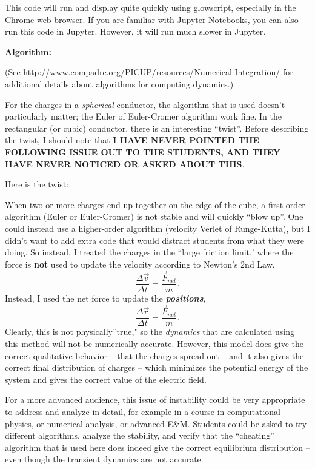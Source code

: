 \documentclass[]{article}
\begin{document}
This code will run and display quite quickly using glowscript,
especially in the Chrome web browser. If you are familiar with Jupyter
Notebooks, you can also run this code in Jupyter. However, it will run
much slower in Jupyter.

\textbf{Algorithm:}

(See
\url{http://www.compadre.org/PICUP/resources/Numerical-Integration/} for
additional details about algorithms for computing dynamics.)

For the charges in a \emph{spherical} conductor, the algorithm that is
used doesn't particularly matter; the Euler of Euler-Cromer algorithm
work fine. In the rectangular (or cubic) conductor, there is an
interesting ``twist''. Before describing the twist, I should note that
\textbf{I HAVE NEVER POINTED THE FOLLOWING ISSUE OUT TO THE STUDENTS,
AND THEY HAVE NEVER NOTICED OR ASKED ABOUT THIS}.

Here is the twist:

When two or more charges end up together on the edge of the cube, a
first order algorithm (Euler or Euler-Cromer) is not stable and will
quickly ``blow up''. One could instead use a higher-order algorithm
(velocity Verlet of Runge-Kutta), but I didn't want to add extra code
that would distract students from what they were doing. So instead, I
treated the charges in the ``large friction limit,' where the force is
\textbf{not} used to update the velocity according to Newton's 2nd Law,
\[\frac{\Delta \vec{v}}{\Delta t} = \frac{\vec{F}_{net}}{m}.\] Instead,
I used the net force to update the \textbf{\emph{positions}},
\[\frac{\Delta \vec{r}}{\Delta t} = \frac{\vec{F}_{net}}{m}.\] Clearly,
this is not physically''true," so the \emph{dynamics} that are
calculated using this method will not be numerically accurate. However,
this model does give the correct qualitative behavior -- that the
charges spread out -- and it also gives the correct final distribution
of charges -- which minimizes the potential energy of the system and
gives the correct value of the electric field.

For a more advanced audience, this issue of instability could be very
appropriate to address and analyze in detail, for example in a course in
computational physics, or numerical analysis, or advanced E\&M. Students
could be asked to try different algorithms, analyze the stability, and
verify that the ``cheating'' algorithm that is used here does indeed
give the correct equilibrium distribution -- even though the transient
dynamics are not accurate.
\end{document}
